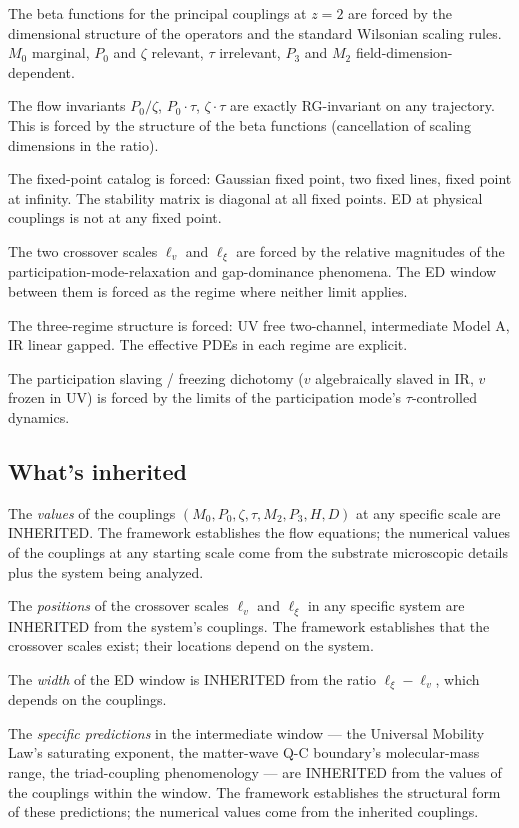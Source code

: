 \documentclass[11pt,a4paper]{article}
\begin{document}
The beta functions for the principal couplings at $z = 2$ are forced by the dimensional structure of the operators and the standard Wilsonian scaling rules. $M_0$ marginal, $P_0$ and $\zeta$ relevant, $\tau$ irrelevant, $P_3$ and $M_2$ field-dimension-dependent.

The flow invariants $P_0/\zeta$, $P_0 \cdot \tau$, $\zeta \cdot \tau$ are exactly RG-invariant on any trajectory. This is forced by the structure of the beta functions (cancellation of scaling dimensions in the ratio).

The fixed-point catalog is forced: Gaussian fixed point, two fixed lines, fixed point at infinity. The stability matrix is diagonal at all fixed points. ED at physical couplings is not at any fixed point.

The two crossover scales $\ell_v$ and $\ell_\xi$ are forced by the relative magnitudes of the participation-mode-relaxation and gap-dominance phenomena. The ED window between them is forced as the regime where neither limit applies.

The three-regime structure is forced: UV free two-channel, intermediate Model A, IR linear gapped. The effective PDEs in each regime are explicit.

The participation slaving / freezing dichotomy ($v$ algebraically slaved in IR, $v$ frozen in UV) is forced by the limits of the participation mode's $\tau$-controlled dynamics.

\subsection{What's inherited}

The \emph{values} of the couplings $(M_0, P_0, \zeta, \tau, M_2, P_3, H, D)$ at any specific scale are INHERITED. The framework establishes the flow equations; the numerical values of the couplings at any starting scale come from the substrate microscopic details plus the system being analyzed.

The \emph{positions} of the crossover scales $\ell_v$ and $\ell_\xi$ in any specific system are INHERITED from the system's couplings. The framework establishes that the crossover scales exist; their locations depend on the system.

The \emph{width} of the ED window is INHERITED from the ratio $\ell_\xi - \ell_v$, which depends on the couplings.

The \emph{specific predictions} in the intermediate window --- the Universal Mobility Law's saturating exponent, the matter-wave Q-C boundary's molecular-mass range, the triad-coupling phenomenology --- are INHERITED from the values of the couplings within the window. The framework establishes the structural form of these predictions; the numerical values come from the inherited couplings.
\end{document}
